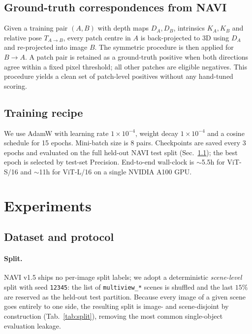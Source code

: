 \documentclass[10pt,twocolumn,letterpaper]{article}
\begin{document}
\subsection{Ground-truth correspondences from NAVI}

Given a training pair $(A, B)$ with depth maps $D_A, D_B$, intrinsics
$K_A, K_B$ and relative pose $T_{A\to B}$, every patch centre in $A$
is back-projected to 3D using $D_A$ and re-projected into image
$B$. The symmetric procedure is then applied for $B\to A$. A
patch pair is retained as a ground-truth positive when both directions
agree within a fixed pixel threshold; all other patches are eligible
negatives. This procedure yields a clean set of patch-level positives
without any hand-tuned scoring.

\subsection{Training recipe}
We use AdamW with learning rate $1\!\times\!10^{-4}$, weight decay
$1\!\times\!10^{-4}$ and a cosine schedule for 15 epochs. Mini-batch
size is $8$ pairs. Checkpoints are saved every 3 epochs and evaluated
on the full held-out NAVI test split (Sec.~\ref{sec:setup}); the best
epoch is selected by test-set Precision. End-to-end wall-clock is
$\sim$5.5h for ViT-S/16 and $\sim$11h for ViT-L/16 on a single
NVIDIA A100 GPU.

\section{Experiments}
\label{sec:results}

\subsection{Dataset and protocol}
\label{sec:setup}

\paragraph{Split.} NAVI v1.5 ships no per-image split labels; we
adopt a deterministic \emph{scene-level} split with seed
\texttt{12345}: the list of \texttt{multiview\_*} scenes is shuffled
and the last $15\%$ are reserved as the held-out test partition.
Because every image of a given scene goes entirely to one side, the
resulting split is image- and scene-disjoint by construction
(Tab.~\ref{tab:split}), removing the most common single-object
evaluation leakage.
\end{document}
